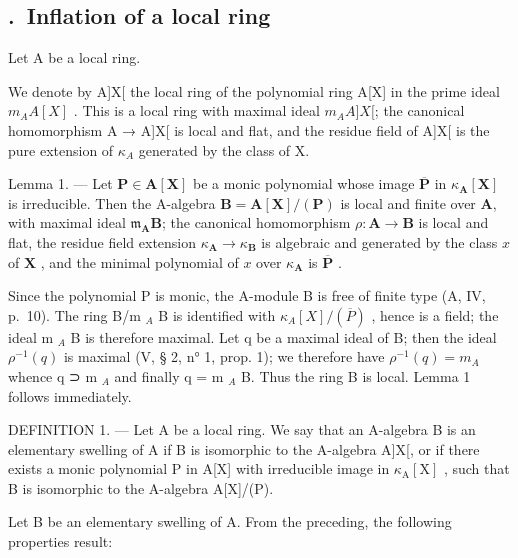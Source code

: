 \subsection*{\theappendixitem.\ Inflation of a local ring}
{}

Let A be a local ring.

We denote by A{]}X{[} the local ring of the polynomial ring A{[}X{]} in the prime ideal \(m_{A}A[X]\) . This is a local ring with maximal ideal \(m_{A}A{]}X{[}\); the canonical homomorphism A → A{]}X{[} is local and flat, and the residue field of A{]}X{[} is the pure extension of \(\kappa_{A}\) generated by the class of X.

Lemma 1. — Let \(\mathbf{P} \in \mathbf{A}[\mathbf{X}]\) be a monic polynomial whose image \(\overline{\mathbf{P}}\) in \(\kappa_{\mathbf{A}}[\mathbf{X}]\) is irreducible. Then the A-algebra \(\mathbf{B} = \mathbf{A}[\mathbf{X}] / (\mathbf{P})\) is local and finite over \(\mathbf{A}\), with maximal ideal \(\mathfrak{m}_{\mathbf{A}}\mathbf{B}\); the canonical homomorphism \(\rho: \mathbf{A} \to \mathbf{B}\) is local and flat, the residue field extension \(\kappa_{\mathbf{A}} \to \kappa_{\mathbf{B}}\) is algebraic and generated by the class \(x\) of \(\mathbf{X}\) , and the minimal polynomial of \(x\) over \(\kappa_{\mathbf{A}}\) is \(\overline{\mathbf{P}}\) .

Since the polynomial P is monic, the A-module B is free of finite type (A, IV, p.~10). The ring B/m \(_{A}\) B is identified with \(\kappa_{A}[X]/(\overline{P})\) , hence is a field; the ideal m \(_{A}\) B is therefore maximal. Let q be a maximal ideal of B; then the ideal \(\rho^{-1}(q)\) is maximal (V, § 2, n° 1, prop. 1); we therefore have \(\rho^{-1}(q)=m_{A}\) whence q ⊃ m \(_{A}\) and finally q = m \(_{A}\) B. Thus the ring B is local. Lemma 1 follows immediately.

DEFINITION 1. --- Let A be a local ring. We say that an A-algebra B is an elementary swelling of A if B is isomorphic to the A-algebra A{]}X{[}, or if there exists a monic polynomial P in A{[}X{]} with irreducible image in \(\kappa_{\mathrm{A}}[\mathrm{X}]\) , such that B is isomorphic to the A-algebra A{[}X{]}/(P).

Let B be an elementary swelling of A. From the preceding, the following properties result:

